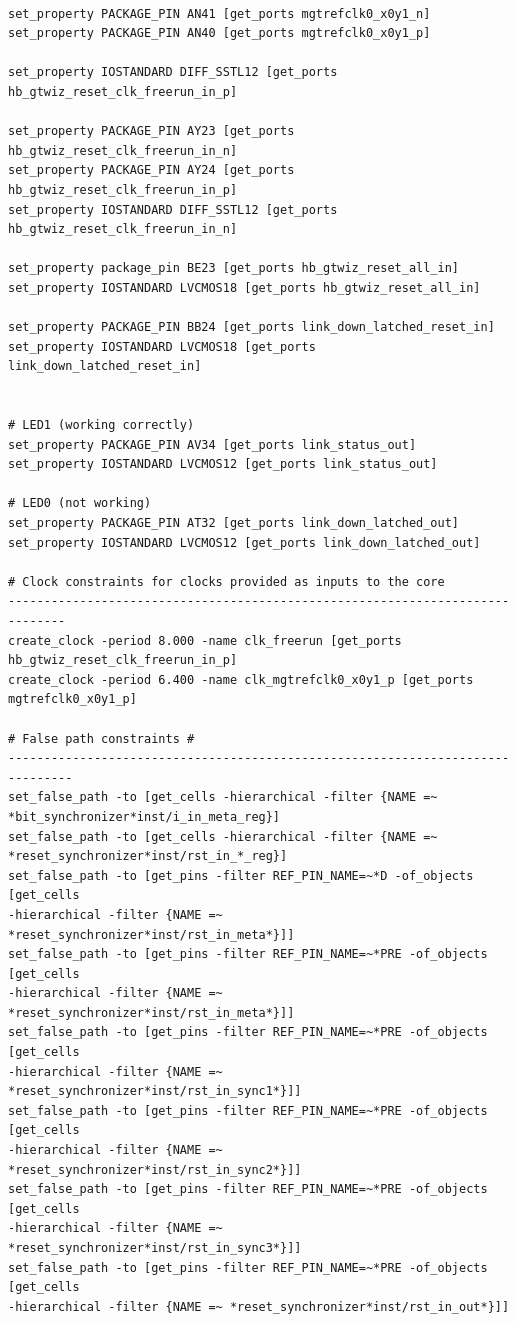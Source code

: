\documentclass[oneside]{discothesis}
\begin{document}
\begin{listing}
\begin{verbatim}

set_property PACKAGE_PIN AN41 [get_ports mgtrefclk0_x0y1_n] 
set_property PACKAGE_PIN AN40 [get_ports mgtrefclk0_x0y1_p]

set_property IOSTANDARD DIFF_SSTL12 [get_ports hb_gtwiz_reset_clk_freerun_in_p]

set_property PACKAGE_PIN AY23 [get_ports hb_gtwiz_reset_clk_freerun_in_n]
set_property PACKAGE_PIN AY24 [get_ports hb_gtwiz_reset_clk_freerun_in_p]
set_property IOSTANDARD DIFF_SSTL12 [get_ports hb_gtwiz_reset_clk_freerun_in_n]

set_property package_pin BE23 [get_ports hb_gtwiz_reset_all_in] 
set_property IOSTANDARD LVCMOS18 [get_ports hb_gtwiz_reset_all_in]

set_property PACKAGE_PIN BB24 [get_ports link_down_latched_reset_in]
set_property IOSTANDARD LVCMOS18 [get_ports link_down_latched_reset_in]


# LED1 (working correctly) 
set_property PACKAGE_PIN AV34 [get_ports link_status_out] 
set_property IOSTANDARD LVCMOS12 [get_ports link_status_out]

# LED0 (not working) 
set_property PACKAGE_PIN AT32 [get_ports link_down_latched_out] 
set_property IOSTANDARD LVCMOS12 [get_ports link_down_latched_out]

# Clock constraints for clocks provided as inputs to the core 
------------------------------------------------------------------------------
create_clock -period 8.000 -name clk_freerun [get_ports hb_gtwiz_reset_clk_freerun_in_p] 
create_clock -period 6.400 -name clk_mgtrefclk0_x0y1_p [get_ports mgtrefclk0_x0y1_p]

# False path constraints #
-------------------------------------------------------------------------------
set_false_path -to [get_cells -hierarchical -filter {NAME =~
*bit_synchronizer*inst/i_in_meta_reg}] 
set_false_path -to [get_cells -hierarchical -filter {NAME =~
*reset_synchronizer*inst/rst_in_*_reg}]
set_false_path -to [get_pins -filter REF_PIN_NAME=~*D -of_objects [get_cells
-hierarchical -filter {NAME =~ *reset_synchronizer*inst/rst_in_meta*}]]
set_false_path -to [get_pins -filter REF_PIN_NAME=~*PRE -of_objects [get_cells
-hierarchical -filter {NAME =~ *reset_synchronizer*inst/rst_in_meta*}]]
set_false_path -to [get_pins -filter REF_PIN_NAME=~*PRE -of_objects [get_cells
-hierarchical -filter {NAME =~ *reset_synchronizer*inst/rst_in_sync1*}]]
set_false_path -to [get_pins -filter REF_PIN_NAME=~*PRE -of_objects [get_cells
-hierarchical -filter {NAME =~ *reset_synchronizer*inst/rst_in_sync2*}]]
set_false_path -to [get_pins -filter REF_PIN_NAME=~*PRE -of_objects [get_cells
-hierarchical -filter {NAME =~ *reset_synchronizer*inst/rst_in_sync3*}]]
set_false_path -to [get_pins -filter REF_PIN_NAME=~*PRE -of_objects [get_cells
-hierarchical -filter {NAME =~ *reset_synchronizer*inst/rst_in_out*}]]



\end{verbatim}
\end{listing}
\end{document}
